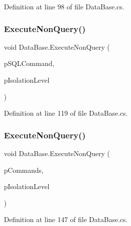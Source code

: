 Definition at line 98 of file Data\+Base.\+cs.

\hypertarget{class_data_base_a1ed538956df719cc72f547b079f75ab9}{}\label{class_data_base_a1ed538956df719cc72f547b079f75ab9} 
\subsubsection{\texorpdfstring{Execute\+Non\+Query()}{ExecuteNonQuery()}\hspace{0.1cm}{\footnotesize\ttfamily [3/4]}}
{\footnotesize\ttfamily void Data\+Base.\+Execute\+Non\+Query (\begin{DoxyParamCaption}\item[{ref Sql\+Command}]{p\+S\+Q\+L\+Command,  }\item[{Isolation\+Level}]{p\+Isolation\+Level }\end{DoxyParamCaption})}



Definition at line 119 of file Data\+Base.\+cs.

\hypertarget{class_data_base_a338f52b6bd35d074adb091765308c9b7}{}\label{class_data_base_a338f52b6bd35d074adb091765308c9b7} 
\subsubsection{\texorpdfstring{Execute\+Non\+Query()}{ExecuteNonQuery()}\hspace{0.1cm}{\footnotesize\ttfamily [4/4]}}
{\footnotesize\ttfamily void Data\+Base.\+Execute\+Non\+Query (\begin{DoxyParamCaption}\item[{List$<$ Sql\+Command $>$}]{p\+Commands,  }\item[{Isolation\+Level}]{p\+Isolation\+Level }\end{DoxyParamCaption})}



Definition at line 147 of file Data\+Base.\+cs.

\hypertarget{class_data_base_a096220b5900862d273830cca2d67e072}{}\label{class_data_base_a096220b5900862d273830cca2d67e072} 
